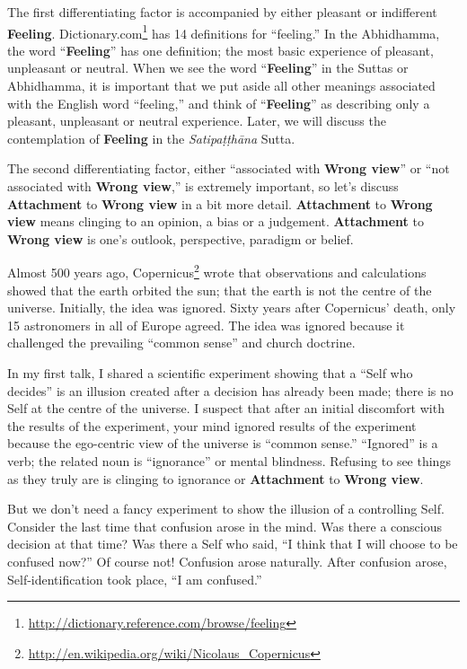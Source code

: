 The first differentiating factor is accompanied by either pleasant or indifferent \textbf{Feeling}. Dictionary.com\footnote{\url{http://dictionary.reference.com/browse/feeling}} has 14 definitions for “feeling.” In the Abhidhamma, the word “\textbf{Feeling}” has one definition; the most basic experience of pleasant, unpleasant or neutral. When we see the word “\textbf{Feeling}” in the Suttas or Abhidhamma, it is important that we put aside all other meanings associated with the English word “feeling,” and think of “\textbf{Feeling}” as describing only a pleasant, unpleasant or neutral experience. Later, we will discuss the contemplation of \textbf{Feeling} in the \textit{Satipaṭṭhāna} Sutta.

The second differentiating factor, either “associated with \textbf{Wrong view}” or “not associated with \textbf{Wrong view},” is extremely important, so let’s discuss \textbf{Attachment} to \textbf{Wrong view} in a bit more detail. \textbf{Attachment} to \textbf{Wrong view} means clinging to an opinion, a bias or a judgement. \textbf{Attachment} to \textbf{Wrong view} is one’s outlook, perspective, paradigm or belief.

Almost 500 years ago, Copernicus\footnote{\url{http://en.wikipedia.org/wiki/Nicolaus_Copernicus}} wrote that observations and calculations showed that the earth orbited the sun; that the earth is not the centre of the universe. Initially, the idea was ignored. Sixty years after Copernicus’ death, only 15 astronomers in all of Europe agreed. The idea was ignored because it challenged the prevailing “common sense” and church doctrine.

In my first talk, I shared a scientific experiment showing that a “Self who decides” is an illusion created after a decision has already been made; there is no Self at the centre of the universe. I suspect that after an initial discomfort with the results of the experiment, your mind ignored results of the experiment because the ego-centric view of the universe is “common sense.” “Ignored” is a verb; the related noun is “ignorance” or mental blindness. Refusing to see things as they truly are is clinging to ignorance or \textbf{Attachment} to \textbf{Wrong view}.

But we don’t need a fancy experiment to show the illusion of a controlling Self. Consider the last time that confusion arose in the mind. Was there a conscious decision at that time? Was there a Self who said, “I think that I will choose to be confused now?” Of course not! Confusion arose naturally. After confusion arose, Self-identification took place, “I am confused.”

